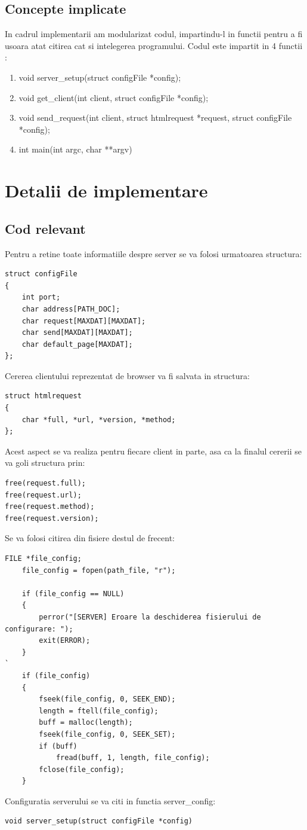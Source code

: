 \documentclass{llncs}
\begin{document}
\subsection{Concepte implicate}
In cadrul implementarii am modularizat codul, impartindu-l in functii pentru a fi usoara
atat citirea cat si intelegerea programului. Codul este impartit in 4 functii :
\begin{enumerate}
  \item void server\_setup(struct configFile *config);
  \item void get\_client(int client, struct configFile *config);
  \item void send\_request(int client, struct htmlrequest *request, struct configFile *config);
  \item int main(int argc, char **argv)
\end{enumerate}



\section{Detalii de implementare}
\subsection{Cod relevant}
Pentru a retine toate informatiile despre server se va folosi urmatoarea structura:
\begin{lstlisting}[style=CStyle]
struct configFile
{
    int port;
    char address[PATH_DOC];     
    char request[MAXDAT][MAXDAT]; 
    char send[MAXDAT][MAXDAT]; 
    char default_page[MAXDAT];   
};
\end{lstlisting}
Cererea clientului reprezentat de browser va fi salvata in structura:
\begin{lstlisting}[style=CStyle]
struct htmlrequest
{
    char *full, *url, *version, *method;
};
\end{lstlisting}
Acest aspect se va realiza pentru fiecare client in parte, asa ca la finalul cererii se va goli structura prin:
\begin{lstlisting}[style=CStyle]
free(request.full);
free(request.url);
free(request.method);
free(request.version);
\end{lstlisting}
Se va folosi citirea din fisiere destul de frecent:
\begin{lstlisting}[style=CStyle]
    FILE *file_config;
    file_config = fopen(path_file, "r");
    
    if (file_config == NULL)
    {
        perror("[SERVER] Eroare la deschiderea fisierului de configurare: ");
        exit(ERROR);
    }
`
    if (file_config)
    {
        fseek(file_config, 0, SEEK_END);
        length = ftell(file_config);
        buff = malloc(length);
        fseek(file_config, 0, SEEK_SET);
        if (buff)
            fread(buff, 1, length, file_config);
        fclose(file_config);
    }
\end{lstlisting}
Configuratia serverului se va citi in functia server\_config\(\):
\begin{lstlisting}[style=CStyle]
void server_setup(struct configFile *config)

\end{lstlisting}
\end{document}
